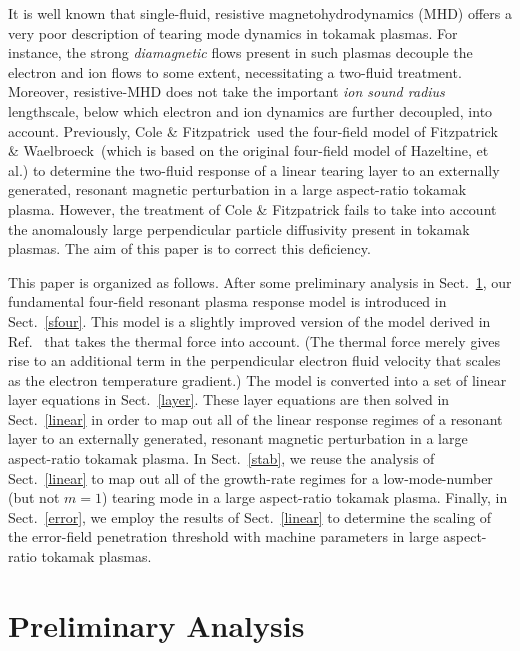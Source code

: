 \documentclass[12pt,prb,aps]{revtex4-1}
\begin{document}
It is well known that single-fluid, resistive magnetohydrodynamics (MHD) offers a very poor description of
tearing mode dynamics in tokamak plasmas. 
For instance, the strong {\em diamagnetic}\/ flows present in such plasmas decouple the electron and ion flows to some extent,
necessitating a two-fluid treatment.\cite{ara} Moreover, resistive-MHD does not take  the important {\em ion sound radius} lengthscale, below which electron and ion dynamics are further decoupled, 
into account.\cite{drake,wal} Previously, Cole \& Fitzpatrick\,\cite{cole} used the four-field model
of Fitzpatrick \& Waelbroeck\,\cite{fw} (which is based on the original four-field model of Hazeltine, et al.\cite{haz}) 
to determine the two-fluid response of a linear tearing layer to an externally generated, 
resonant magnetic perturbation  in a large aspect-ratio tokamak plasma. However, the treatment of Cole \& Fitzpatrick fails to take into account the
 anomalously large perpendicular  particle diffusivity  present in tokamak plasmas. The
aim of this paper is to correct this deficiency. 

This paper is organized as follows. After some preliminary analysis in Sect.~\ref{sect1}, our fundamental four-field resonant
plasma response model is introduced in Sect.~\ref{sfour}. This model is a slightly improved version of the model derived in Ref.~ that takes the thermal force into account. (The thermal force merely gives rise to an additional term  in the perpendicular electron fluid velocity that scales as the electron temperature gradient.) The model is converted into a set of linear layer equations in
Sect.~\ref{layer}. These layer equations are then solved in Sect.~\ref{linear} in order to map out all of the linear response regimes
of a resonant layer to an externally generated, resonant magnetic perturbation in a large aspect-ratio tokamak plasma. In Sect.~\ref{stab}, we reuse the analysis of Sect.~\ref{linear} to map out all
of the growth-rate regimes for a low-mode-number (but not $m=1$) tearing mode in a large aspect-ratio tokamak plasma. Finally,
in Sect.~\ref{error}, we employ the results of Sect.~\ref{linear} to determine the scaling of the error-field penetration threshold with machine parameters
 in large aspect-ratio tokamak plasmas. 

\section{Preliminary Analysis}\label{sect1}
\end{document}
